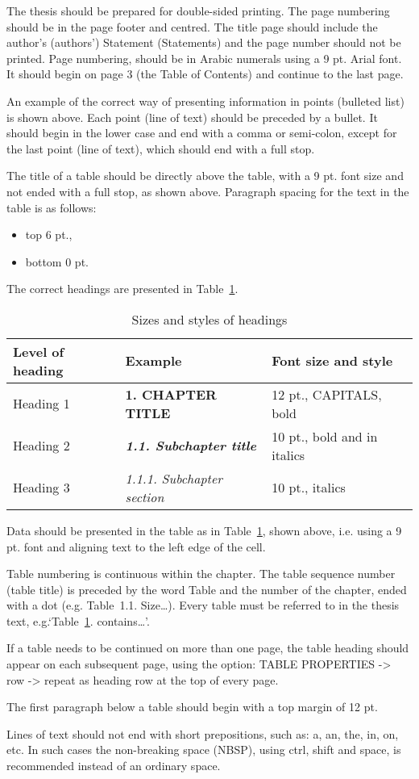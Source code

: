 The thesis should be prepared for double-sided printing. The page numbering should be in the page footer and centred. The title page should include the author’s (authors’) Statement (Statements) and the page number should not be printed. Page numbering, should be in Arabic numerals using a 9 pt. Arial font. It should begin on page 3 (the Table of Contents) and continue to the last page.

An example of the correct way of presenting information in points (bulleted list) is shown above. Each point (line of text) should be preceded by a bullet. It should begin in the lower case and end with a comma or semi-colon, except for the last point (line of text), which should end with a full stop.

The title of a table should be directly above the table, with a 9 pt. font size and not ended with a full stop, as shown above. Paragraph spacing for the text in the table is as follows:
\begin{itemize}
	\item top 6 pt.,
	\item bottom 0 pt.
\end{itemize}

The correct headings are presented in Table~\ref{tab:heading-styles}.

\begin{table}[h]
	\caption{Sizes and styles of headings}
	\label{tab:heading-styles}
	\begin{tabularx}{\textwidth}{|X|X|X|}
		\hline
		Level of heading	& Example 					& Font size and style \\ \hline
		Heading 1 			& \textbf{1. CHAPTER TITLE}			& 12 pt., CAPITALS, bold \\ \hline
		Heading 2			& \textbf{\textit{1.1. Subchapter title}}		& 10 pt., bold and in italics \\ \hline
		Heading 3			& \textit{1.1.1. Subchapter section}	& 10 pt., italics \\ \hline
	\end{tabularx}
\end{table}

Data should be presented in the table as in Table~\ref{tab:heading-styles}, shown above, i.e. using a 9 pt. font and aligning text to the left edge of the cell.

Table numbering is continuous within the chapter. The table sequence number (table title) is preceded by the word Table and the number of the chapter, ended with a dot (e.g. Table~1.1. Size\ldots). Every table must be referred to in the thesis text, e.g.`Table~\ref{tab:heading-styles}. contains\ldots'.

If a table needs to be continued on more than one page, the table heading should appear on each subsequent page, using the option: TABLE PROPERTIES -> row -> repeat as heading row at the top of every page.

The first paragraph below a table should begin with a top margin of 12 pt.

Lines of text should not end with short prepositions, such as: a, an, the, in, on, etc. In such cases the non-breaking space (NBSP), using ctrl, shift and space, is recommended instead of an ordinary space.
